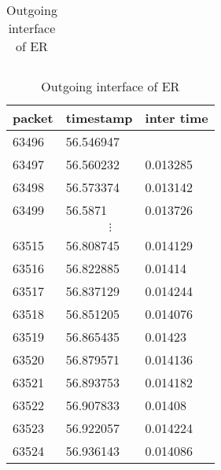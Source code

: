 \documentclass[a4paper,9pt]{beamer}
\begin{document}
{\begin{table}[htbp]
\begin{minipage}{0.5\linewidth}
\begin{tabular}{|l|l|l|}
    \hline
  \end{tabular}
  \end{minipage}
  \begin{minipage}{0.4\linewidth}%
  \caption{Outgoing interface of ER }
  \begin{tabular}{|l|l|l|}
    \hline    
     packet & timestamp& inter time\\
\hline
    63496 &56.546947&\\
 \hline
     63497&56.560232&0.013285\\
 \hline
63498&56.573374&0.013142\\
\hline
63499&56.5871&0.013726\\
\hline
\multicolumn{3}{|c|}{$\vdots$} \\
\hline
63515&56.808745&0.014129\\
\hline
63516&56.822885&0.01414\\
\hline
63517&56.837129&0.014244\\
\hline
63518&56.851205&0.014076\\
\hline
63519&56.865435&0.01423\\
\hline
63520&56.879571&0.014136\\
\hline
63521&56.893753&0.014182\\
\hline
63522&56.907833&0.01408\\
\hline
63523&56.922057&0.014224\\
\hline
63524&56.936143&0.014086\\

\end{tabular}
\end{minipage}
\end{table}}
\end{document}
